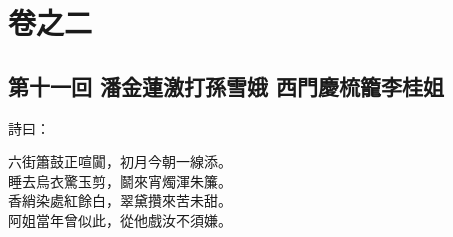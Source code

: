 \part*{{\titlename}卷之二}



\chapter*{第十一回 潘金蓮激打孫雪娥 西門慶梳籠李桂姐}


詩曰：

\begin{myquote}
六街簫鼓正喧闐，初月今朝一線添。\\睡去烏衣驚玉剪，鬬來宵燭渾朱簾。\\香綃染處紅餘白，翠黛攢來苦未甜。\\阿姐當年曾似此，從他戲汝不須嫌。
\end{myquote}

